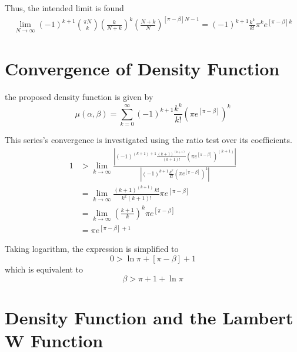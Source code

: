 \documentclass{article}
\newcommand{\aabs}[1]{\left| #1 \right|}
\newcommand{\ppar}[1]{\left( #1 \right)}
\newcommand{\spar}[1]{\left[ #1 \right]}
\begin{document}
Thus, the intended limit is found
\begin{multline}
    \lim_{N \rightarrow \infty}
    (-1)^{k+1} 
    \binom{\pi N}{k}
    \ppar{\frac{k}{N+k}}^k
    \ppar{\frac{N+k}{N}}^{\spar{\pi-\beta} N -1}
    =
    (-1)^{k+1}
    \frac{k^k}{k!}
    \pi ^k
    e^{\spar{\pi - \beta}k}
\end{multline}

\section{Convergence of Density Function}
\label{ap:convergence}

the proposed density function is given by
\begin{equation}
    \mu(\alpha, \beta) =
    \sum_{k=0}^{\infty}
    (-1)^{k+1} \frac{k^k}{k!} 
    \ppar{\pi
    e^{\spar{\pi-\beta}} }^k
\end{equation}

This series's convergence is investigated using the ratio test over its coefficients.
\begin{align*}
    1 &>
    \lim_{k\rightarrow \infty}
    \frac{\aabs{
    (-1)^{\ppar{k+1}+1} \frac{\ppar{k+1}^{\ppar{k+1}}}{\ppar{k+1}!} 
    \ppar{\pi
    e^{\spar{\pi-\beta}} }^{\ppar{k+1}}
    }}{\aabs{
    (-1)^{k+1} \frac{k^k}{k!} 
    \ppar{\pi
    e^{\spar{\pi-\beta}} }^k
    }}
    \\
    &=
    \lim_{k\rightarrow \infty}
    {
    \frac{\ppar{k+1}^{\ppar{k+1}}\, k! }{{k}^{k} \ppar{k+1}!}
    {\pi e^{\spar{\pi-\beta}} }
    }
    \\
    &=
    \lim_{k\rightarrow \infty}
    \ppar{\frac{k+1}{k}}^k {\pi e^{\spar{\pi-\beta}} }
    \\
    &=
    {\pi e^{\spar{\pi-\beta}+1} }
\end{align*}

Taking logarithm, the expression is simplified to
\begin{equation}
    0 > \ln{\pi} + \spar{\pi-\beta}+1
\end{equation}
which is equivalent to
\begin{equation}
    \beta > \pi + 1 + \ln{\pi}
\end{equation}

\section{Density Function and the Lambert W Function}
\label{ap:identities}
\end{document}

